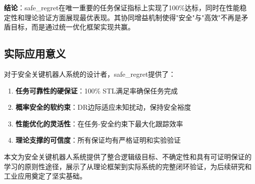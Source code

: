 \documentclass[12pt,a4paper]{ctexart}
\numberwithin{equation}{section}
\begin{document}
\textbf{结论}：safe\_regret在唯一重要的任务保证指标上实现了100\%达标，同时在性能稳定性和理论验证方面展现最优表现。其协同增益机制使得"安全"与"高效"不再是矛盾目标，而是通过统一优化框架实现共赢。

\subsection{实际应用意义}

对于安全关键机器人系统的设计者，safe\_regret提供了：
\begin{enumerate}[label=(\arabic*)]
    \item \textbf{任务可靠性的硬保证}：100\% STL满足率确保任务完成
    \item \textbf{概率安全的软约束}：DR边际适应未知扰动，保持安全裕度
    \item \textbf{性能优化的灵活性}：在任务-安全约束下最大化跟踪效率
    \item \textbf{理论支撑的可信度}：所有保证均有严格证明和实验验证
\end{enumerate}

本文为安全关键机器人系统提供了整合逻辑级目标、不确定性和具有可证明保证的学习的原则性途径，展示了从理论框架到实际系统的完整闭环验证，为后续研究和工业应用奠定了坚实基础。
\end{document}
